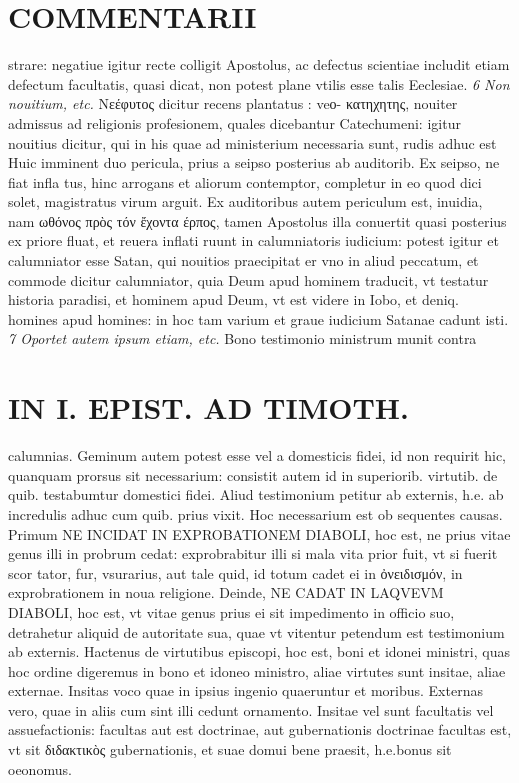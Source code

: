 \documentclass{article}
\begin{document}
\begin{pages}
\section*{COMMENTARII }
\marginpar{[ p.68 ]}\pstart strare: negatiue igitur recte colligit Apostolus, ac defectus scientiae includit etiam defectum facultatis, quasi dicat, non potest plane vtilis esse talis Eeclesiae.  \pend
\textit{6 Non nouitium, etc. }\pstart Νεέφυτος dicitur recens plantatus : veο- κατηχητης, nouiter admissus ad religionis profesionem, quales dicebantur Catechumeni: igitur nouitius dicitur, qui in his quae ad ministerium necessaria sunt, rudis adhuc est Huic imminent duo pericula, prius a seipso posterius ab auditorib. Ex seipso, ne fiat infla tus, hinc arrogans et aliorum contemptor, completur in eo quod dici solet, magistratus virum arguit. Ex auditoribus autem periculum est, inuidia, nam ωθόνος πρὸς τόν ἔχοντα έρπος, tamen Apostolus illa conuertit quasi posterius ex priore fluat, et reuera inflati ruunt in calumniatoris iudicium: potest igitur et calumniator esse Satan, qui nouitios praecipitat er vno in aliud peccatum, et commode dicitur calumniator, quia Deum apud hominem traducit, vt testatur historia paradisi, et hominem apud Deum, vt est videre in Iobo, et deniq. homines apud homines: in hoc tam varium et graue iudicium Satanae cadunt isti.  \pend
\textit{7 Oportet autem ipsum etiam, etc. }\pstart Bono testimonio ministrum munit contra  \pend
\section*{IN I. EPIST. AD TIMOTH. }
\marginpar{[ p.69 ]}\pstart calumnias. Geminum autem potest esse vel a domesticis fidei, id non requirit hic, quanquam prorsus sit necessarium: consistit autem id in superiorib. virtutib. de quib. testabumtur domestici fidei. Aliud testimonium petitur ab externis, h.e. ab incredulis adhuc cum quib. prius vixit. Hoc necessarium est ob sequentes causas. Primum NE INCIDAT IN EXPROBATIONEM DIABOLI, hoc est, ne prius vitae genus illi in probrum cedat: exprobrabitur illi si mala vita prior fuit, vt si fuerit scor tator, fur, vsurarius, aut tale quid, id totum cadet ei in ὀνειδισμόν, in exprobrationem in noua religione. Deinde, NE CADAT IN LAQVEVM DIABOLI, hoc est, vt vitae genus prius ei sit impedimento in officio suo, detrahetur aliquid de autoritate sua, quae vt vitentur petendum est testimonium ab externis. Hactenus de virtutibus episcopi, hoc est, boni et idonei ministri, quas hoc ordine digeremus in bono et idoneo ministro, aliae virtutes sunt insitae, aliae externae. Insitas voco quae in ipsius ingenio quaeruntur et moribus. Externas vero, quae in aliis cum sint illi cedunt ornamento. Insitae vel sunt facultatis vel assuefactionis: facultas aut est doctrinae, aut gubernationis doctrinae facultas est, vt sit διδακτικὸς gubernationis, et suae domui bene praesit, h.e.bonus sit oeonomus.  \pend

\end{pages}
\end{document}
